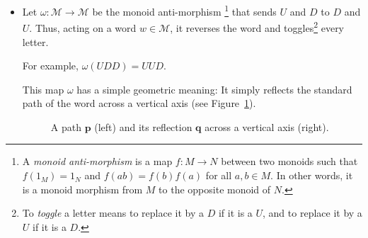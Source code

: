 \documentclass[numbers=enddot,12pt,final,onecolumn,notitlepage]{scrartcl}%
\theoremstyle{definition}
\newcommand{\M}{\mathcal{M}}
\newcommand{\pp}{\mathbf{p}}
\newcommand{\qq}{\mathbf{q}}
\newcommand{\tup}[1]{\left( #1 \right)}
\newenvironment{vershort}{}{}
\begin{document}
\begin{itemize}
\item Let $\omega : \M \to \M$ be the monoid
anti-morphism%
\footnote{A \emph{monoid anti-morphism} is a map $f : M \to N$ between two monoids such that $f\tup{1_M} = 1_N$ and $f\tup{ab} = f\tup{b}f\tup{a}$ for all $a, b \in M$. In other words, it is a monoid morphism from $M$ to the opposite monoid of $N$.}
that sends $U$ and $D$ to $D$ and $U$.
Thus, acting on a
word $w\in\M$, it reverses the word and toggles\footnote{To \emph{toggle} a letter means to replace it by a $D$ if it is a $U$, and to replace it by a $U$ if it is a $D$.} every letter.

For example, $\omega\tup{UDD} = UUD$.

\begin{vershort}
This map $\omega$ has a simple geometric meaning:
It simply reflects the standard path of the word across a vertical axis (see Figure~\ref{fig.reflect}).

\begin{figure}[htbp]
\begin{center}
\qquad
{}
\qquad
{}
\end{center}
\caption{A path $\pp$ (left) and its reflection $\qq$ across a vertical axis (right).}
\label{fig.reflect}
\end{figure}
\end{vershort}


\end{itemize}
\end{document}
